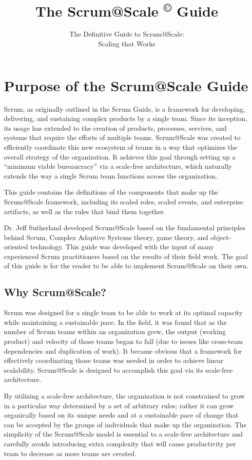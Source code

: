 \documentclass[12pt,a4paper,parskip=full]{scrartcl}
\title{\Huge{\color{red}\textbf{The Scrum@Scale
\textsuperscript{\copyright}
Guide}}}
\subtitle{\color{gray}The Definitive Guide to Scrum@Scale:\\ Scaling that
Works}
\date{}
\begin{document}

\section{Purpose of the Scrum@Scale Guide}
Scrum, as originally outlined in the Scrum Guide, is a framework for
developing, delivering, and sustaining complex products by a single team.
Since its inception, its usage has extended to the creation of products,
processes, services, and systems that require the efforts of multiple
teams. Scrum@Scale was created to efficiently coordinate this new ecosystem
of teams in a way that optimizes the overall strategy of the organization.
It achieves this goal through setting up a ``minimum viable bureaucracy''
via a scale-free architecture, which naturally extends the way a single
Scrum team functions across the organization.

This guide contains the definitions of the components that make up the
Scrum@Scale framework, including its scaled roles, scaled events, and
enterprise artifacts, as well as the rules that bind them together.

Dr. Jeff Sutherland developed Scrum@Scale based on the fundamental
principles behind Scrum, Complex Adaptive Systems theory, game theory, and
object-oriented technology. This guide was developed with the input of many
experienced Scrum practitioners based on the results of their field work.
The goal of this guide is for the reader to be able to implement Scrum@Scale
on their own.

\subsection{Why Scrum@Scale?}
Scrum was designed for a single team to be able to work at its optimal
capacity while maintaining a sustainable pace. In the field, it was found
that as the number of Scrum teams within an organization grew, the 
output (working product) and velocity of those teams began to fall (due to
issues like cross-team dependencies and duplication of work). It became
obvious that a framework for effectively coordinating those teams was
needed in order to achieve linear scalability. Scrum@Scale is designed to
accomplish this goal via its scale-free architecture.

By utilizing a scale-free architecture, the organization is not constrained
to grow in a particular way determined by a set of arbitrary rules; rather
it can grow organically based on its unique needs and at a sustainable pace
of change that can be accepted by the groups of individuals that make up
the organization. The simplicity of the Scrum@Scale model is essential to a scale-free architecture and carefully avoids introducing extra complexity that will cause productivity per team to decrease as more teams are created.
\end{document}

